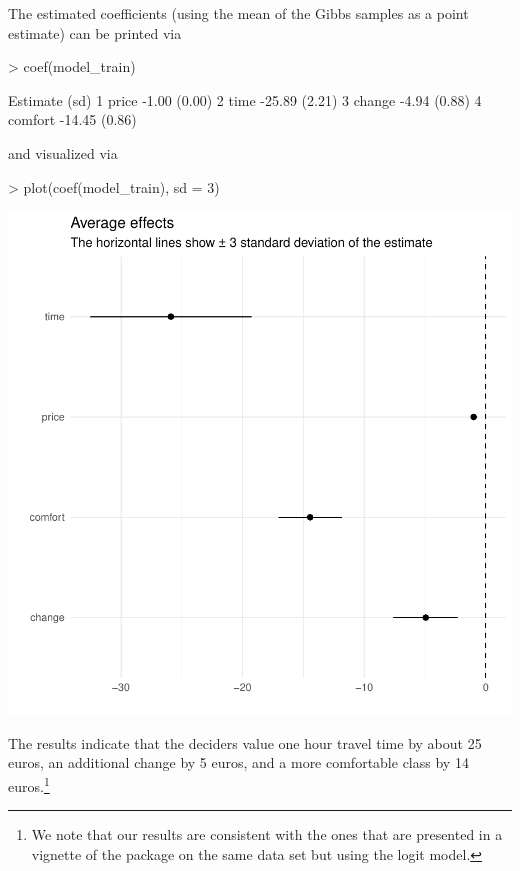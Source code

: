 \documentclass[article]{jss}
\begin{document}
The estimated coefficients (using the mean of the Gibbs samples as a point estimate) can be printed via

\begin{Schunk}
\begin{Sinput}
> coef(model_train)
\end{Sinput}
\begin{Soutput}
           Estimate   (sd)
1   price     -1.00 (0.00)
2    time    -25.89 (2.21)
3  change     -4.94 (0.88)
4 comfort    -14.45 (0.86)
\end{Soutput}
\end{Schunk}

and visualized via

\begin{Schunk}
\begin{Sinput}
> plot(coef(model_train), sd = 3)
\end{Sinput}
\end{Schunk}
\includegraphics{rprobitb_oelschlaeger_bauer-plot-coef-model-train}

The results indicate that the deciders value one hour travel time by about 25 euros, an additional change by 5 euros, and a more comfortable class by 14 euros.\footnote{We note that our results are consistent with the ones that are presented in a vignette of the  package on the same data set but using the logit model.}
\end{document}
